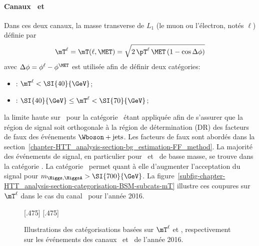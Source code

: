\paragraph{Canaux \mu\tauh\ et \ele\tauh}
Dans ces deux canaux, la masse transverse de $L_1$ (le muon ou l'électron, notés $\ell$) définie par
\begin{equation}
\mT^{\ell} = \mT(\ell, \MET) = \sqrt{2 \, \pT^{\ell} \, \MET \, (1-\cos\Delta\phi)} \label{eq-mT_def-ell}
\end{equation}
avec $\Delta\phi = \phi^{\ell} - \phi^{\MET}$
est utilisée afin de définir deux catégories:
\begin{itemize}
\item \CATtightmt: $\mT^{\ell} < \SI{40}{\GeV}$;
\item \CATloosemt: $\SI{40}{\GeV} \leq \mT^{\ell} < \SI{70}{\GeV}$;
\end{itemize}
la limite haute sur \mT\ pour la catégorie \CATloosemt\ étant appliquée afin de s'assurer que la région de signal soit orthogonale à la région de détermination (DR) des facteurs de faux des événements $\Wboson+\text{jets}$.
Les facteurs de faux sont abordés dans la section~\ref{chapter-HTT_analysis-section-bg_estimation-FF_method}.
La majorité des événements de signal, en particulier pour \Higgs\ et \HiggsA\ de basse masse, se trouve dans la catégorie \CATtightmt.
La catégorie \CATloosemt\ permet quant à elle d'augmenter l'acceptation du signal pour $m_{\Higgs,\HiggsA} > \SI{700}{\GeV}$.
La figure~\ref{subfig-chapter-HTT_analysis-section-categorisation-BSM-subcats-mT} illustre ces coupures sur $\mT^{\ell}$ dans le cas du canal \ele\tauh\ pour l'année 2016.
\begin{figure}[h]
\centering

[.475\textwidth]
{}
\hfill
{}[.475\textwidth]
{}

\caption[Illustrations des catégorisations basées sur $\mT^{\ell}$ et \Dzeta]{Illustrations des catégorisations basées sur $\mT^{\ell}$ et \Dzeta, respectivement sur les événements des canaux \ele\tauh\ et \ele\mu\ de l'année 2016.}
\label{fig-chapter-HTT_analysis-section-categorisation-BSM-subcats}
\end{figure}
